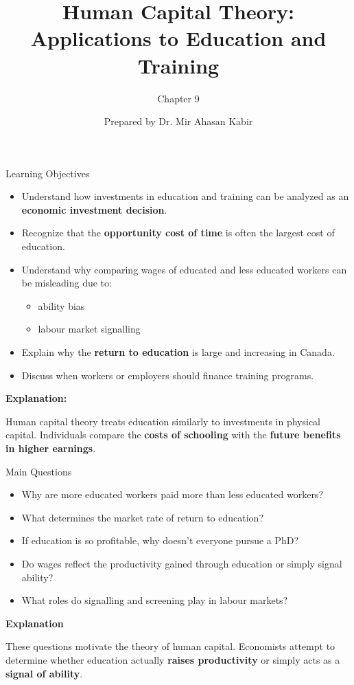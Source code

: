 \documentclass[aspectratio=169]{beamer}
\title{Human Capital Theory: Applications to Education and Training}
\subtitle{Chapter 9}
\author{Prepared by Dr. Mir Ahasan Kabir}
\institute{York University}
\date{}
\begin{document}
\begin{frame}
\titlepage
\end{frame}

\begin{frame}{Learning Objectives}
\begin{itemize}
\item Understand how investments in education and training can be analyzed as an \textbf{economic investment decision}.
\item Recognize that the \textbf{opportunity cost of time} is often the largest cost of education.
\item Understand why comparing wages of educated and less educated workers can be misleading due to:
\begin{itemize}
\item ability bias
\item labour market signalling
\end{itemize}
\item Explain why the \textbf{return to education} is large and increasing in Canada.
\item Discuss when workers or employers should finance training programs.
\end{itemize}

\textbf{Explanation:}

Human capital theory treats education similarly to investments in physical capital. Individuals compare the \textbf{costs of schooling} with the \textbf{future benefits in higher earnings}.
\end{frame}

\begin{frame}{Main Questions}
\begin{itemize}
\item Why are more educated workers paid more than less educated workers?
\item What determines the market rate of return to education?
\item If education is so profitable, why doesn’t everyone pursue a PhD?
\item Do wages reflect the productivity gained through education or simply signal ability?
\item What roles do signalling and screening play in labour markets?
\end{itemize}

\textbf{Explanation}

These questions motivate the theory of human capital. Economists attempt to determine whether education actually \textbf{raises productivity} or simply acts as a \textbf{signal of ability}.
\end{frame}
\end{document}
